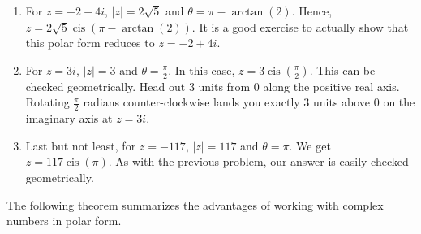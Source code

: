 {\begin{enumerate}
\begin{enumerate}
\item  For $z = -2+4i$, $|z| = 2\sqrt{5}$ and $\theta = \pi - \arctan(2)$.  Hence, $z = 2\sqrt{5} \operatorname{cis}(\pi - \arctan(2))$.  It is a good exercise to actually show that this polar form reduces to $z=-2+4i$.

\item  For $z = 3i$, $|z| = 3$ and $\theta = \frac{\pi}{2}$.  In this case, $z = 3 \operatorname{cis}\left(\frac{\pi}{2}\right)$.  This can be checked geometrically.  Head out $3$ units from $0$ along the positive real axis. Rotating $\frac{\pi}{2}$ radians counter-clockwise lands you exactly $3$ units above $0$ on the imaginary axis at $z = 3i$.

\item  Last but not least, for $z = -117$, $|z| = 117$ and $\theta = \pi$. We get $z = 117 \operatorname{cis}(\pi)$. As with the previous problem, our answer is easily checked geometrically. 

\end{enumerate}

\end{enumerate}
}

\medskip

The following theorem summarizes the advantages of working with complex numbers in polar form.

\medskip


